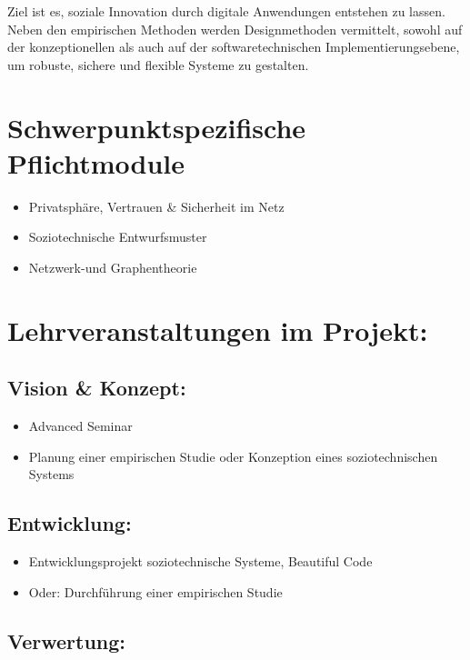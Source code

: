 Ziel ist es, soziale Innovation durch digitale Anwendungen entstehen zu
lassen. Neben den empirischen Methoden werden Designmethoden vermittelt,
sowohl auf der konzeptionellen als auch auf der softwaretechnischen
Implementierungsebene, um robuste, sichere und flexible Systeme zu
gestalten.

\section*{Schwerpunktspezifische
Pflichtmodule}\label{schwerpunktspezifische-pflichtmodule-2}

\begin{itemize}
\item
  Privatsphäre, Vertrauen \& Sicherheit im Netz
\item
  Soziotechnische Entwurfsmuster
\item
  Netzwerk-und Graphentheorie
\end{itemize}

\section*{Lehrveranstaltungen im
Projekt:}\label{lehrveranstaltungen-im-projekt-2}

\subsection*{Vision \& Konzept:}\label{vision-konzept-2}

\begin{itemize}
\item
  Advanced Seminar
\item
  Planung einer empirischen Studie oder Konzeption eines
  soziotechnischen Systems
\end{itemize}

\subsection*{Entwicklung:}\label{entwicklung-2}

\begin{itemize}
\item
  Entwicklungsprojekt soziotechnische Systeme, Beautiful Code
\item
  Oder: Durchführung einer empirischen Studie
\end{itemize}

\subsection*{Verwertung:}\label{verwertung-2}

